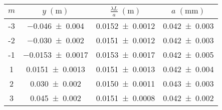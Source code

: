 \begin{tabular}{cc|cc}
\toprule
$m$ &      $y \; (\si{\m})$ & $\frac{\lambda L}{a} \; (\si{\m})$ &  $a \; (\si{\mm})$ \\
\midrule
 -3 &   \num{-0.046+-0.004} &               \num{0.0152+-0.0012} & \num{0.042+-0.003} \\
 -2 &   \num{-0.030+-0.002} &               \num{0.0151+-0.0012} & \num{0.042+-0.003} \\
 -1 & \num{-0.0153+-0.0017} &               \num{0.0153+-0.0017} & \num{0.042+-0.005} \\
  1 &  \num{0.0151+-0.0013} &               \num{0.0151+-0.0013} & \num{0.042+-0.004} \\
  2 &    \num{0.030+-0.002} &               \num{0.0150+-0.0011} & \num{0.043+-0.003} \\
  3 &    \num{0.045+-0.002} &               \num{0.0151+-0.0008} & \num{0.042+-0.002} \\
\bottomrule
\end{tabular}
